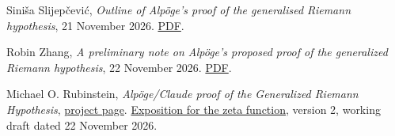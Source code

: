 Siniša Slijepčević,
\emph{Outline of Alpöge's proof of the generalised Riemann hypothesis},
21 November 2026.
\href{https://hexagonmath.org/pdf/2611.00812}{PDF}.

Robin Zhang,
\emph{A preliminary note on Alpöge's proposed proof of the generalized Riemann hypothesis},
22 November 2026.
\href{https://www.ihes.fr/~rzhang/files/GRH\%20note.pdf}{PDF}.

Michael O. Rubinstein,
\emph{Alpöge/Claude proof of the Generalized Riemann Hypothesis},
\href{https://math.uwaterloo.ca/~mrubinst/alpoge_claude_grh/}{project page}.
\href{https://math.uwaterloo.ca/~mrubinst/alpoge_claude_grh/zeta-paper_v2.pdf}{Exposition for the zeta function},
version 2, working draft dated 22 November 2026.
